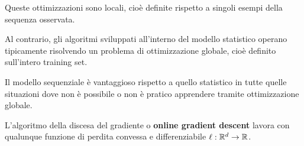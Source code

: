 \documentclass[\main/main.tex]{subfiles}
\begin{document}
\begin{multicols}{2}
\begin{observation}
    Queste ottimizzazioni sono locali, cioè definite rispetto a singoli esempi della sequenza osservata.
    
    Al contrario, gli algoritmi sviluppati all'interno del modello statistico operano tipicamente risolvendo un problema di ottimizzazione globale, cioè definito sull'intero training set.
    
    Il modello sequenziale è vantaggioso rispetto a quello statistico in tutte quelle situazioni dove non è possibile o non è pratico apprendere tramite ottimizzazione globale.
\end{observation}
\begin{definition}
    L'algoritmo della discesa del gradiente o \textbf{online gradient descent} lavora con qualunque funzione di perdita convessa e differenziabile \(\ell: \mathbb{R}^d\rightarrow \mathbb{R}\).
    

\end{definition}
\end{multicols}
\end{document}
